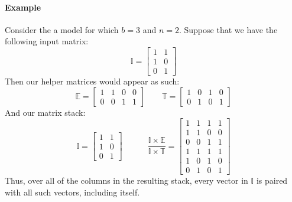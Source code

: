 \paragraph{Example}
Consider the a model for which $b=3$ and $n=2$. Suppose that we have the 
following input matrix: 
\[ 
	\mathbb{I} = \begin{bmatrix} 1 & 1\\ 1 & 0\\ 0 & 1\end{bmatrix}
\]
Then our helper matrices would appear as such:
\[
	\mathbb{E} = \begin{bmatrix}
		1 & 1 & 0 & 0\\
		0 & 0 & 1 & 1
	\end{bmatrix}
	\hspace{2em}
	\mathbb{T} = \begin{bmatrix}
		1 & 0 & 1 & 0\\
	0 & 1 & 0 & 1 \end{bmatrix}
\]
And our matrix stack:
\[
	\mathbb{I} = \begin{bmatrix} 1 & 1\\ 1 & 0\\ 0 & 1\end{bmatrix}
	\hspace{3em}
	\frac{\mathbb{I} \times \mathbb{E}}{\mathbb{I} \times \mathbb{T}} = 
	\begin{bmatrix}
		1 & 1 & 1 & 1\\
		1 & 1 & 0 & 0\\
		0 & 0 & 1 & 1\\
		1 & 1 & 1 & 1\\
		1 & 0 & 1 & 0\\
		0 & 1 & 0 & 1
	\end{bmatrix}
\]
Thus, over all of the columns in the resulting stack, every vector in 
$\mathbb{I}$ is paired with all such vectors, including itself.

